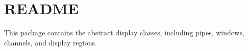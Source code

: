 \chapter{README}
\hypertarget{md_panda_2src_2display_2README}{}\label{md_panda_2src_2display_2README}
This package contains the abstract display classes, including pipes, windows, channels, and display regions. 